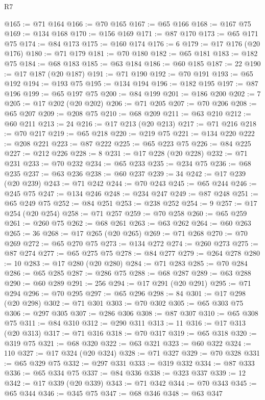\begin{lexlean}{R7}
\begin{coremodule}
@165 := @71 @164
@166 := @70 @165
@167 := @65 @166
@168 := @167 @75
@169 := @134 @168
@170 := @156 @169
@171 := @87 @170
@173 := @65 @171 @75
@174 := @84 @173
@175 := @160 @174
@176 := 6
@179 := @17 @176 (@20 @176)
@180 := @71 @179
@181 := @70 @180
@182 := @65 @181
@183 := @182 @75
@184 := @68 @183
@185 := @63 @184
@186 := @60 @185
@187 := 22
@190 := @17 @187 (@20 @187)
@191 := @71 @190
@192 := @70 @191
@193 := @65 @192
@194 := @193 @75
@195 := @134 @194
@196 := @182 @195
@197 := @87 @196
@199 := @65 @197 @75
@200 := @84 @199
@201 := @186 @200
@202 := 7
@205 := @17 @202 (@20 @202)
@206 := @71 @205
@207 := @70 @206
@208 := @65 @207
@209 := @208 @75
@210 := @68 @209
@211 := @63 @210
@212 := @60 @211
@213 := 24
@216 := @17 @213 (@20 @213)
@217 := @71 @216
@218 := @70 @217
@219 := @65 @218
@220 := @219 @75
@221 := @134 @220
@222 := @208 @221
@223 := @87 @222
@225 := @65 @223 @75
@226 := @84 @225
@227 := @212 @226
@228 := 8
@231 := @17 @228 (@20 @228)
@232 := @71 @231
@233 := @70 @232
@234 := @65 @233
@235 := @234 @75
@236 := @68 @235
@237 := @63 @236
@238 := @60 @237
@239 := 34
@242 := @17 @239 (@20 @239)
@243 := @71 @242
@244 := @70 @243
@245 := @65 @244
@246 := @245 @75
@247 := @134 @246
@248 := @234 @247
@249 := @87 @248
@251 := @65 @249 @75
@252 := @84 @251
@253 := @238 @252
@254 := 9
@257 := @17 @254 (@20 @254)
@258 := @71 @257
@259 := @70 @258
@260 := @65 @259
@261 := @260 @75
@262 := @68 @261
@263 := @63 @262
@264 := @60 @263
@265 := 36
@268 := @17 @265 (@20 @265)
@269 := @71 @268
@270 := @70 @269
@272 := @65 @270 @75
@273 := @134 @272
@274 := @260 @273
@275 := @87 @274
@277 := @65 @275 @75
@278 := @84 @277
@279 := @264 @278
@280 := 10
@283 := @17 @280 (@20 @280)
@284 := @71 @283
@285 := @70 @284
@286 := @65 @285
@287 := @286 @75
@288 := @68 @287
@289 := @63 @288
@290 := @60 @289
@291 := 256
@294 := @17 @291 (@20 @291)
@295 := @71 @294
@296 := @70 @295
@297 := @65 @296
@298 := 84
@301 := @17 @298 (@20 @298)
@302 := @71 @301
@303 := @70 @302
@305 := @65 @303 @75
@306 := @297 @305
@307 := @286 @306
@308 := @87 @307
@310 := @65 @308 @75
@311 := @84 @310
@312 := @290 @311
@313 := 11
@316 := @17 @313 (@20 @313)
@317 := @71 @316
@318 := @70 @317
@319 := @65 @318
@320 := @319 @75
@321 := @68 @320
@322 := @63 @321
@323 := @60 @322
@324 := 110
@327 := @17 @324 (@20 @324)
@328 := @71 @327
@329 := @70 @328
@331 := @65 @329 @75
@332 := @297 @331
@333 := @319 @332
@334 := @87 @333
@336 := @65 @334 @75
@337 := @84 @336
@338 := @323 @337
@339 := 12
@342 := @17 @339 (@20 @339)
@343 := @71 @342
@344 := @70 @343
@345 := @65 @344
@346 := @345 @75
@347 := @68 @346
@348 := @63 @347

\end{coremodule}
\end{lexlean}
